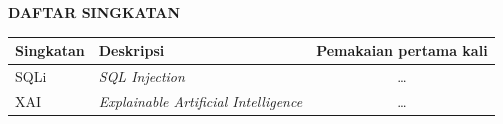 \clearpage
\begin{center}
  {\fontsize{14}{16.8}\selectfont\bfseries DAFTAR SINGKATAN}
\end{center}

\begin{longtable}{@{} l >{\raggedright\arraybackslash}p{8cm} c @{}}
\textbf{Singkatan} & \textbf{Deskripsi} & \parbox[c]{3cm}{\centering\textbf{Pemakaian pertama kali}} \\[1ex]
\endhead
SQLi & \textit{SQL Injection} & \ldots \\
XAI & \textit{Explainable Artificial Intelligence} & \ldots \\
\end{longtable}
